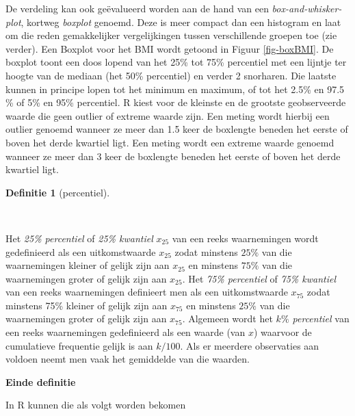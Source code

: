 \documentclass[
  dutch,
  letterpaper,
  12pt]{book}
\newenvironment{Shaded}{\begin{snugshade}}{\end{snugshade}}
\newcommand{\AttributeTok}[1]{\textcolor[rgb]{0.40,0.45,0.13}{#1}}
\newcommand{\ConstantTok}[1]{\textcolor[rgb]{0.56,0.35,0.01}{#1}}
\newcommand{\DecValTok}[1]{\textcolor[rgb]{0.68,0.00,0.00}{#1}}
\newcommand{\FloatTok}[1]{\textcolor[rgb]{0.68,0.00,0.00}{#1}}
\newcommand{\FunctionTok}[1]{\textcolor[rgb]{0.28,0.35,0.67}{#1}}
\newcommand{\NormalTok}[1]{\textcolor[rgb]{0.00,0.23,0.31}{#1}}
\newcommand{\SpecialCharTok}[1]{\textcolor[rgb]{0.37,0.37,0.37}{#1}}
\theoremstyle{definition}
\theoremstyle{definition}
\newtheorem{definition}{Definitie}[chapter]
\theoremstyle{definition}
\theoremstyle{remark}
\begin{document}
De verdeling kan ook geëvalueerd worden aan de hand van een
\emph{box-and-whisker-plot}, kortweg \emph{boxplot} genoemd. Deze is
meer compact dan een histogram en laat om die reden gemakkelijker
vergelijkingen tussen verschillende groepen toe (zie verder). Een
Boxplot voor het BMI wordt getoond in Figuur \ref{fig-boxBMI}. De
boxplot toont een doos lopend van het 25\% tot 75\% percentiel met een
lijntje ter hoogte van de mediaan (het 50\% percentiel) en verder 2
snorharen. Die laatste kunnen in principe lopen tot het minimum en
maximum, of tot het 2.5\% en 97.5 \% of 5\% en 95\% percentiel. R kiest
voor de kleinste en de grootste geobserveerde waarde die geen outlier of
extreme waarde zijn. Een meting wordt hierbij een outlier genoemd
wanneer ze meer dan 1.5 keer de boxlengte beneden het eerste of boven
het derde kwartiel ligt. Een meting wordt een extreme waarde genoemd
wanneer ze meer dan 3 keer de boxlengte beneden het eerste of boven het
derde kwartiel ligt.

\begin{definition}[percentiel]\protect\hypertarget{def-percentiel}{}\label{def-percentiel}

~

\end{definition}

Het \emph{25\% percentiel} of \emph{25\% kwantiel} \(x_{25}\) van een
reeks waarnemingen wordt gedefinieerd als een uitkomstwaarde \(x_{25}\)
zodat minstens \(25\%\) van die waarnemingen kleiner of gelijk zijn aan
\(x_{25}\) en minstens \(75\%\) van die waarnemingen groter of gelijk
zijn aan \(x_{25}\). Het \emph{75\% percentiel} of \emph{75\% kwantiel}
van een reeks waarnemingen definieert men als een uitkomstwaarde
\(x_{75}\) zodat minstens 75\% kleiner of gelijk zijn aan \(x_{75}\) en
minstens \(25\%\) van die waarnemingen groter of gelijk zijn aan
\(x_{75}\). Algemeen wordt het \emph{\(k\%\) percentiel} van een reeks
waarnemingen gedefinieerd als een waarde (van \(x\)) waarvoor de
cumulatieve frequentie gelijk is aan \(k/100.\) Als er meerdere
observaties aan voldoen neemt men vaak het gemiddelde van die waarden.

\textbf{Einde definitie}

In R kunnen die als volgt worden bekomen

\begin{Shaded}
\end{Shaded}
\end{document}
